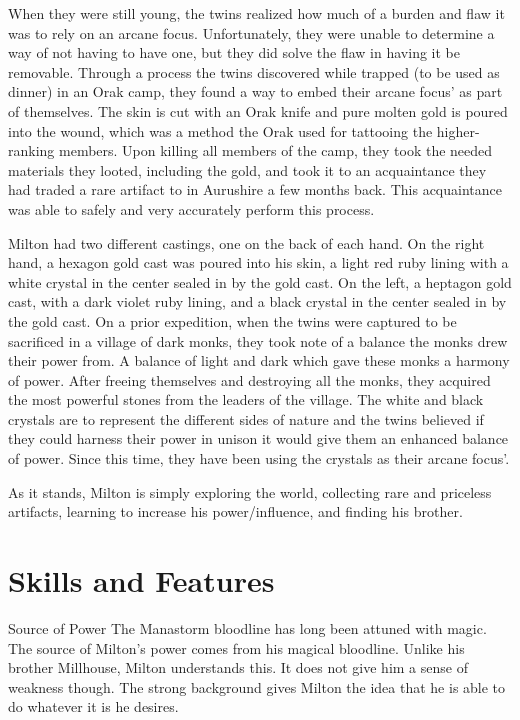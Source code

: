 \documentclass[letterpaper,10pt,twoside,twocolumn,openany]{book}
\begin{document}
When they were still young, the twins realized how much of a burden and flaw it was to rely on an arcane focus. Unfortunately, they were unable to determine a way of not having to have one, but they did solve the flaw in having it be removable. Through a process the twins discovered while trapped (to be used as dinner) in an Orak camp, they found a way to embed their arcane focus' as part of themselves.  The skin is cut with an Orak knife and pure molten gold is poured into the wound, which was a method the Orak used for tattooing the higher-ranking members. Upon killing all members of the camp, they took the needed materials they looted, including the gold, and took it to an acquaintance they had traded a rare artifact to in Aurushire a few months back. This acquaintance was able to safely and very accurately perform this process. 

Milton had two different castings, one on the back of each hand. On the right hand, a hexagon gold cast was poured into his skin, a light red ruby lining with a white crystal in the center sealed in by the gold cast. On the left, a heptagon gold cast, with a dark violet ruby lining, and a black crystal in the center sealed in by the gold cast. On a prior expedition, when the twins were captured to be sacrificed in a village of dark monks, they took note of a balance the monks drew their power from. A balance of light and dark which gave these monks a harmony of power. After freeing themselves and destroying all the monks, they acquired the most powerful stones from the leaders of the village. The white and black crystals are to represent the different sides of nature and the twins believed if they could harness their power in unison it would give them an enhanced balance of power. Since this time, they have been using the crystals as their arcane focus'.

As it stands, Milton is simply exploring the world, collecting rare and priceless artifacts, learning to increase his power/influence, and finding his brother.


\chapter{Skills and Features}

\begin{paperbox}[float=!t]{Source of Power}
	The Manastorm bloodline has long been attuned with magic. The source of Milton's power comes from his magical bloodline. Unlike his brother Millhouse, Milton understands this. It does not give him a sense of weakness though. The strong background gives Milton the idea that he is able to do whatever it is he desires.
\end{paperbox}
\end{document}

